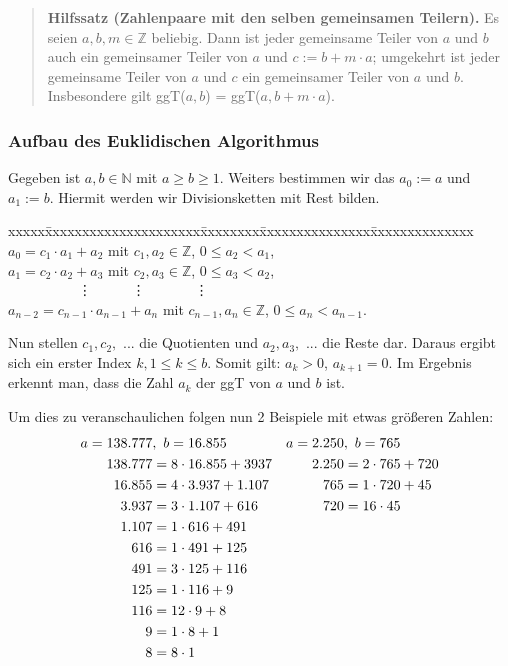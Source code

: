 \documentclass[12pt,a4paper]{article}
\theoremstyle{definition}
\begin{document}
\begin{quote}
\small
\textbf{Hilfssatz (Zahlenpaare mit den selben gemeinsamen Teilern).}
Es seien $a, b, m \in \mathbb{Z}$ beliebig. Dann ist jeder gemeinsame Teiler von $a$ und $b$ auch ein gemeinsamer Teiler von $a$ und $c := b + m \cdot a$; umgekehrt ist jeder gemeinsame Teiler von $a$ und $c$ ein gemeinsamer Teiler von $a$ und $b$.
Insbesondere gilt ggT($a, b$) = ggT($a, b + m \cdot a$).\newline
\autocite[17]{RempeGillen2009}\newpage
\end{quote}
\subsubsection{Aufbau des Euklidischen Algorithmus}
Gegeben ist $a, b \in \mathbb{N}$ mit $a \ge b \ge 1$.
Weiters bestimmen wir das $a_0 := a$ und $a_1 := b$.
Hiermit werden wir Divisionsketten mit Rest bilden.
\begin{tabbing}
xxxxx\=xxxxxxxxxxxxxxxxxxxxx\=xxxxxxxx\=xxxxxxxxxxxxxxx\=xxxxxxxxxxxxxx\kill
\> $a_0 = c_1 \cdot a_1 + a_2$             \> mit \> $c_1, a_2 \in \mathbb{Z}$,     \> $0 \le a_2 < a_1$,  \\
\> $a_1 = c_2 \cdot a_2 + a_3$             \> mit \> $c_2, a_3 \in \mathbb{Z}$,     \> $0 \le a_3 < a_2$,  \\
\> \ \ \ \ \ \ \ \ \ \ \vdots              \>     \>\ \ \ \ \ \vdots                \>\ \ \ \ \ \ \ \vdots \\
\> $a_{n-2} = c_{n-1} \cdot a_{n-1} + a_n$ \> mit \> $c_{n-1}, a_n \in \mathbb{Z}$, \> $0 \le a_n < a_{n-1}$.
\end{tabbing}
Nun stellen $c_1, c_2,$ ... die Quotienten und $a_2, a_3,$ ... die Reste dar. Daraus ergibt sich ein erster Index $k, 1 \le k \le b$.
Somit gilt: $a_k > 0$, $a_{k+1} = 0$.\newline
Im Ergebnis erkennt man, dass die Zahl $a_k$ der ggT von $a$ und $b$ ist.

Um dies zu veranschaulichen folgen nun 2 Beispiele mit etwas größeren Zahlen:
\begin{align}\setcounter{equation}{-1}
a = 138.777 &,\ b = 16.855       & a = 2.250 &,\ b = 765 \\
138.777 &= 8 \cdot 16.855 + 3937 & 2.250 &= 2 \cdot 765 + 720 \\
16.855  &= 4 \cdot 3.937 + 1.107 & 765   &= 1 \cdot 720 + 45 \\
3.937   &= 3 \cdot 1.107 + 616   & 720   &= 16 \cdot 45 \\
1.107   &= 1 \cdot 616 + 491     &  \\
616     &= 1 \cdot 491 + 125     &  \\
491     &= 3 \cdot 125 + 116     &  \\
125     &= 1 \cdot 116 + 9       &  \\
116     &= 12 \cdot 9 + 8        &  \\
9       &= 1 \cdot 8 + 1         &  \\
8       &= 8 \cdot 1
\end{align}
\end{document}
